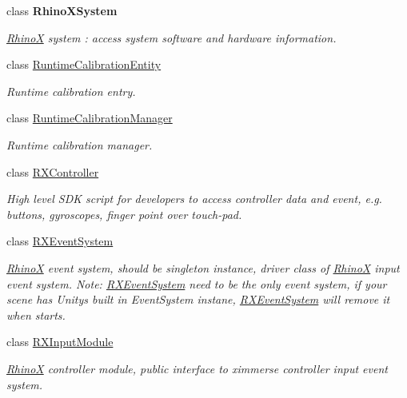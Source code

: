 \begin{DoxyCompactItemize}
class {\bfseries Rhino\+X\+System}
\begin{DoxyCompactList}\small\item\em \mbox{\hyperlink{namespace_ximmerse_1_1_rhino_x}{RhinoX}} system \+: access system software and hardware information. \end{DoxyCompactList}\item 
class \mbox{\hyperlink{class_ximmerse_1_1_rhino_x_1_1_runtime_calibration_entity}{Runtime\+Calibration\+Entity}}
\begin{DoxyCompactList}\small\item\em Runtime calibration entry. \end{DoxyCompactList}\item 
class \mbox{\hyperlink{class_ximmerse_1_1_rhino_x_1_1_runtime_calibration_manager}{Runtime\+Calibration\+Manager}}
\begin{DoxyCompactList}\small\item\em Runtime calibration manager. \end{DoxyCompactList}\item 
class \mbox{\hyperlink{class_ximmerse_1_1_rhino_x_1_1_r_x_controller}{R\+X\+Controller}}
\begin{DoxyCompactList}\small\item\em High level S\+DK script for developers to access controller data and event, e.\+g. buttons, gyroscopes, finger point over touch-\/pad. \end{DoxyCompactList}\item 
class \mbox{\hyperlink{class_ximmerse_1_1_rhino_x_1_1_r_x_event_system}{R\+X\+Event\+System}}
\begin{DoxyCompactList}\small\item\em \mbox{\hyperlink{namespace_ximmerse_1_1_rhino_x}{RhinoX}} event system, should be singleton instance, driver class of \mbox{\hyperlink{namespace_ximmerse_1_1_rhino_x}{RhinoX}} input event system. Note\+: \mbox{\hyperlink{class_ximmerse_1_1_rhino_x_1_1_r_x_event_system}{R\+X\+Event\+System}} need to be the only event system, if your scene has Unity\textquotesingle{}s built in Event\+System instane, \mbox{\hyperlink{class_ximmerse_1_1_rhino_x_1_1_r_x_event_system}{R\+X\+Event\+System}} will remove it when starts. \end{DoxyCompactList}\item 
class \mbox{\hyperlink{class_ximmerse_1_1_rhino_x_1_1_r_x_input_module}{R\+X\+Input\+Module}}
\begin{DoxyCompactList}\small\item\em \mbox{\hyperlink{namespace_ximmerse_1_1_rhino_x}{RhinoX}} controller module, public interface to ximmerse controller input event system. \end{DoxyCompactList}\item 

\end{DoxyCompactItemize}
